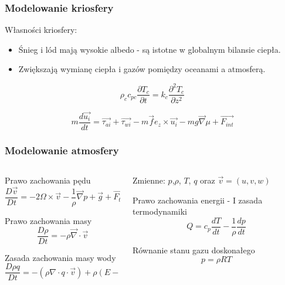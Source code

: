 \documentclass{beamer}
\begin{document}
\begin{frame}
	\frametitle{Modelowanie kriosfery}
	Własności kriosfery:
	\begin{itemize}
		\item Śnieg i lód mają wysokie albedo - są istotne w globalnym bilansie ciepła. 
		\item Zwiększają wymianę ciepła i gazów pomiędzy oceanami a atmosferą.
	\end{itemize}
\begin{block}{}
\[ \rho_c c_{pc} \frac{\partial T_c}{\partial t} = k_c \frac{\partial^2 T_c}{\partial z^2}	
\]	
\end{block}
\begin{block}{}
\[ m\frac{d\vec{u_i}}{dt	} = \vec{\tau_{ai}} + \vec{\tau_{wi}} -m\vec{f}e_z\times\vec{u_i} - mg\vec{\nabla}\mu + \vec{F_{int}} 
\]	
\end{block}

	
\end{frame}

\begin{frame}
	\frametitle{Modelowanie atmosfery}
	\begin{columns}
\begin{column}{0.5\textwidth}
		\begin{block}{Prawo zachowania pędu}
			\[
				\frac{D\vec{v}}{Dt} = -2 \Omega \times \vec{v} - \frac{1}{\rho}
			\vec{\nabla} p + \vec{g} + \vec{F_{tar}}
			\]
		
		\end{block}
		
		\begin{block}{Prawo zachowania masy}
		\[
			\frac{D\rho}{Dt} = -\rho\vec{\nabla} \cdot \vec{v}
		\]
		\end{block}
		\begin{block}{Zasada zachowania masy wody}
			\[
				\frac{D\rho q}{Dt} = -(\rho\nabla \cdot q \cdot \vec{v}) + \rho(E-C)
			\]

	\end{block}
	\end{column}
	\begin{column}{0.5\textwidth}
	Zmienne: $p$,$\rho$, $T$, $q$ oraz $\vec{v} =(u,v,w)$
		\begin{block}{Prawo zachowania energii - I zasada termodynamiki}
			\[Q = c_p\frac{dT}{dt} - \frac{1}{\rho}\frac{dp}{dt}
			\]
		\end{block}
		
		\begin{block}{Równanie stanu gazu doskonałego}		
			\[p=\rho RT
			\]
		\end{block}
	\end{column}
	\end{columns}
\end{frame}
\end{document}
